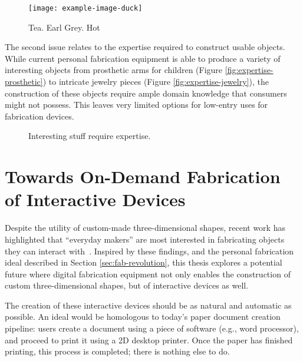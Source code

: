     \begin{figure}[h]
      \centering
      \texttt{[image: example-image-duck]}
      \label{fig:replicator}
      \caption{Tea. Earl Grey. Hot}
    \end{figure}

    The second issue relates to the expertise required to construct usable
    objects. While current personal fabrication equipment is able to produce a
    variety of interesting objects from prosthetic arms for children (Figure
    \ref{fig:expertise-prosthetic}) to intricate jewelry pieces (Figure
    \ref{fig:expertise-jewelry}), the construction of these objects require
    ample domain knowledge that consumers might not possess.  This leaves very
    limited options for low-entry uses for fabrication devices.

    \begin{figure}[h]
      \centering
       \hfill
      \label{}

      \caption{Interesting stuff require expertise.}
    \end{figure}

  \section{Towards On-Demand Fabrication of Interactive Devices} \label{sec:on-demand}
    Despite the utility of custom-made three-dimensional shapes, recent work has
    highlighted that ``everyday makers'' are most interested in fabricating
    objects they can interact with~\cite{Shewbridge:2014}. Inspired by these
    findings, and the personal fabrication ideal described in Section
    \ref{sec:fab-revolution}, this thesis explores a potential future where
    digital fabrication equipment not only enables the construction of custom
    three-dimensional shapes, but of interactive devices as well.

    The creation of these interactive devices should be as natural and automatic
    as possible. An ideal  would be homologous to today's paper
    document creation pipeline: users create a document using a piece of
    software (e.g., word processor), and proceed to print it using a 2D desktop
    printer. Once the paper has finished printing, this process is completed;
    there is nothing else to do.

